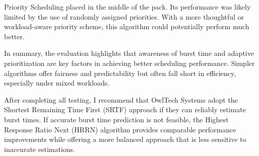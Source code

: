 \documentclass[conference]{report}
\begin{document}
Priority Scheduling placed in the middle of the pack. Its performance was likely limited by the use of randomly assigned priorities. With a more thoughtful or workload-aware priority scheme, this algorithm could potentially perform much better.

In summary, the evaluation highlights that awareness of burst time and adaptive prioritization are key factors in achieving better scheduling performance. Simpler algorithms offer fairness and predictability but often fall short in efficiency, especially under mixed workloads.

After completing all testing, I recommend that OwlTech Systems adopt the Shortest Remaining Time First (SRTF) approach if they can reliably estimate burst times. If accurate burst time prediction is not feasible, the Highest Response Ratio Next (HRRN) algorithm provides comparable performance improvements while offering a more balanced approach that is less sensitive to inaccurate estimations.

\end{document}

